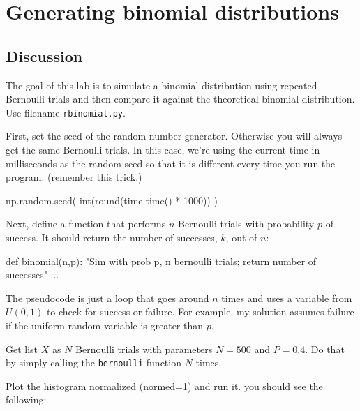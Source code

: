 \chapter{Generating binomial distributions}

\setcounter{problem}{1}
\section{Discussion}

\begin{fullwidth}

The goal of this lab is to simulate a binomial distribution using repeated Bernoulli trials and then compare it against the theoretical binomial distribution. Use filename {\tt rbinomial.py}.

\step First, set the seed of the random number generator. Otherwise you will always get the same  Bernoulli trials. In this case, we're using the current time in milliseconds as the random seed so that it is different every time you run the program. (remember this trick.)

\begin{pyverbatim}
np.random.seed( int(round(time.time() * 1000)) )
\end{pyverbatim}

\step Next, define a function that performs $n$ Bernoulli trials with probability $p$ of success. It should return the number of successes, $k$, out of $n$:

\begin{pyverbatim}
def binomial(n,p):
    "Sim with prob p, n bernoulli trials; return number of successes"
    ...
\end{pyverbatim}

The pseudocode is just a loop that goes around $n$ times and uses a variable from $U(0,1)$ to check for success or failure. For example, my solution assumes failure if the uniform random variable is greater than $p$.
    
\step Get list $X$ as $N$ Bernoulli trials with parameters $N=500$ and $P=0.4$. Do that by simply calling the {\tt bernoulli} function $N$ times.

\step Plot the histogram normalized (normed=1) and run it. you should see the following:


\end{fullwidth}
